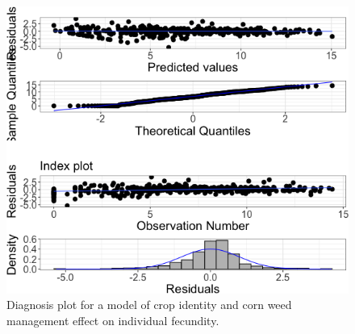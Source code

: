 \documentclass[
]{article}
\begin{document}
\begin{figure}
\includegraphics[width=1\linewidth]{AppendixC_model_diagnosis_files/figure-latex/indiv-biom-seed-18-1} \caption{Diagnosis plot for a model of crop identity and corn weed management effect on individual fecundity.}\label{fig:indiv-biom-seed-18}
\end{figure}
\end{document}
